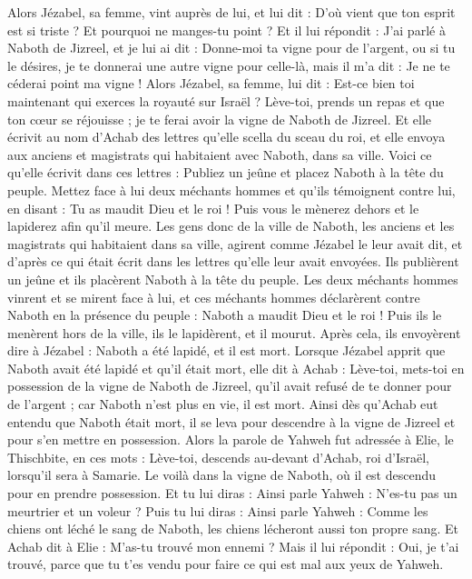 \begin{multicols}{2}
Alors Jézabel, sa femme, vint auprès de lui, et lui dit : D'où vient que ton esprit est si triste ? Et pourquoi ne manges-tu point ?
Et il lui répondit : J’ai parlé à Naboth de Jizreel, et je lui ai dit : Donne-moi ta vigne pour de l'argent, ou si tu le désires, je te donnerai une autre vigne pour celle-là, mais il m'a dit : Je ne te céderai point ma vigne !
Alors Jézabel, sa femme, lui dit : Est-ce bien toi maintenant qui exerces la royauté sur Israël ? Lève-toi, prends un repas et que ton cœur se réjouisse ; je te ferai avoir la vigne de Naboth de Jizreel.
Et elle écrivit au nom d'Achab des lettres qu’elle scella du sceau du roi, et elle envoya aux anciens et magistrats qui habitaient avec Naboth, dans sa ville.
Voici ce qu’elle écrivit dans ces lettres : Publiez un jeûne et placez Naboth à la tête du peuple.
Mettez face à lui deux méchants hommes et qu'ils témoignent contre lui, en disant : Tu as maudit Dieu et le roi ! Puis vous le mènerez dehors et le lapiderez afin qu'il meure.
Les gens donc de la ville de Naboth, les anciens et les magistrats qui habitaient dans sa ville, agirent comme Jézabel le leur avait dit, et d’après ce qui était écrit dans les lettres qu'elle leur avait envoyées.
Ils publièrent un jeûne et ils placèrent Naboth à la tête du peuple.
Les deux méchants hommes vinrent et se mirent face à lui, et ces méchants hommes déclarèrent contre Naboth en la présence du peuple : Naboth a maudit Dieu et le roi ! Puis ils le menèrent hors de la ville, ils le lapidèrent, et il mourut.
Après cela, ils envoyèrent dire à Jézabel : Naboth a été lapidé, et il est mort.
Lorsque Jézabel apprit que Naboth avait été lapidé et qu'il était mort, elle dit à Achab : Lève-toi, mets-toi en possession de la vigne de Naboth de Jizreel, qu’il avait refusé de te donner pour de l'argent ; car Naboth n'est plus en vie, il est mort.
Ainsi dès qu'Achab eut entendu que Naboth était mort, il se leva pour descendre à la vigne de Jizreel et pour s'en mettre en possession.
Alors la parole de Yahweh fut adressée à Elie, le Thischbite, en ces mots :
Lève-toi, descends au-devant d'Achab, roi d'Israël, lorsqu'il sera à Samarie. Le voilà dans la vigne de Naboth, où il est descendu pour en prendre possession.
Et tu lui diras : Ainsi parle Yahweh : N’es-tu pas un meurtrier et un voleur ? Puis tu lui diras : Ainsi parle Yahweh : Comme les chiens ont léché le sang de Naboth, les chiens lécheront aussi ton propre sang.
Et Achab dit à Elie : M'as-tu trouvé mon ennemi ? Mais il lui répondit : Oui, je t'ai trouvé, parce que tu t'es vendu pour faire ce qui est mal aux yeux de Yahweh.

\end{multicols}
